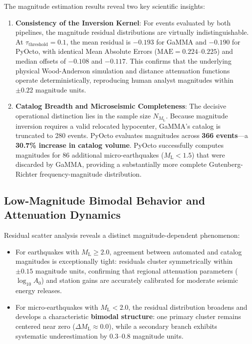 The magnitude estimation results reveal two key scientific insights:
\begin{enumerate}
  \item \textbf{Consistency of the Inversion Kernel}: For events evaluated by both pipelines, the magnitude residual distributions are virtually indistinguishable. At $\tau_{\mathrm{threshold}} = 0.1$, the mean residual is $-0.193$ for GaMMA and $-0.190$ for PyOcto, with identical Mean Absolute Errors ($\mathrm{MAE} = 0.224\text{--}0.225$) and median offsets of $-0.108$ and $-0.117$. This confirms that the underlying physical Wood-Anderson simulation and distance attenuation functions operate deterministically, reproducing human analyst magnitudes within $\pm 0.22$ magnitude units.
  \item \textbf{Catalog Breadth and Microseismic Completeness}: The decisive operational distinction lies in the sample size $N_{M_{\mathrm{L}}}$. Because magnitude inversion requires a valid relocated hypocenter, GaMMA's catalog is truncated to 280 events. PyOcto evaluates magnitudes across \textbf{366 events}---a \textbf{30.7\% increase in catalog volume}. PyOcto successfully computes magnitudes for 86 additional micro-earthquakes ($M_{\mathrm{L}} < 1.5$) that were discarded by GaMMA, providing a substantially more complete Gutenberg-Richter frequency-magnitude distribution.
\end{enumerate}

\subsection{Low-Magnitude Bimodal Behavior and Attenuation Dynamics}
\label{subsec:bimodal_magnitude}

Residual scatter analysis reveals a distinct magnitude-dependent phenomenon:
\begin{itemize}
  \item For earthquakes with $M_{\mathrm{L}} \ge 2.0$, agreement between automated and catalog magnitudes is exceptionally tight: residuals cluster symmetrically within $\pm 0.15$ magnitude units, confirming that regional attenuation parameters ($\log_{10} A_0$) and station gains are accurately calibrated for moderate seismic energy releases.
  \item For micro-earthquakes with $M_{\mathrm{L}} < 2.0$, the residual distribution broadens and develops a characteristic \textbf{bimodal structure}: one primary cluster remains centered near zero ($\Delta M_{\mathrm{L}} \approx 0.0$), while a secondary branch exhibits systematic underestimation by $0.3\text{--}0.8$ magnitude units.
\end{itemize}

